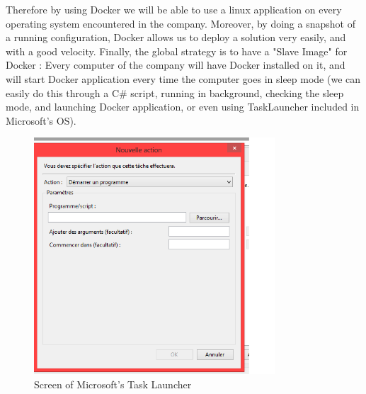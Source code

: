\documentclass[11pt]{report} %
\begin{document}
Therefore by using Docker we will be able to use a linux application on every operating system encountered in the company.
Moreover, by doing a snapshot of a running configuration, Docker allows us to deploy a solution very easily, and with a good velocity.
Finally, the global strategy is to have a "Slave Image" for Docker : 
Every computer of the company will have Docker installed on it, and will start Docker application every time the computer goes in sleep mode (we can easily do this through a C\# script, running in background, checking the sleep mode, and launching Docker application, or even using TaskLauncher included in Microsoft's OS).
\begin{figure}[ht!]
\centering
\includegraphics[width=90mm]{screen.png}
\caption{Screen of Microsoft's Task Launcher \label{overflow}}
\end{figure}
\end{document}
